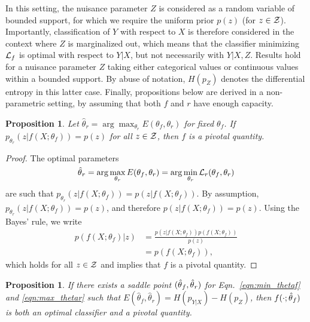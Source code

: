 \documentclass[twocolumn,superscriptaddress,aps]{revtex4-1}
\theoremstyle{plain}
\newtheorem{proposition}[theorem]{Proposition}
\begin{document}
In this setting, the nuisance parameter $Z$ is considered as a random variable
of bounded support, for which we require the uniform prior $p(z)$ (for $z \in
{\cal Z}$). Importantly, classification of $Y$ with respect to $X$ is therefore
considered in the context where $Z$ is marginalized out, which means that the
classifier minimizing ${\cal L}_f$ is optimal with respect to $Y|X$, but not
necessarily with $Y|X,Z$. Results hold for a nuisance parameter $Z$ taking
either categorical values or continuous values within a bounded support. By
abuse of notation, $H(p_Z)$ denotes the differential entropy in this latter
case. Finally, propositions below are derived in a non-parametric setting, by
assuming that both $f$ and $r$ have enough capacity.

\begin{proposition}\label{prop:1}
Let $\hat\theta_r = \arg \max_{\theta_r} E(\theta_f,
\theta_r)$ for fixed $\theta_f$. If $p_{\theta_r}(z|f(X;\theta_f)) = p(z)$
for all $z \in {\cal Z}$, then $f$ is a pivotal quantity.
\end{proposition}

\begin{proof}
The optimal parameters $$\smash{\hat\theta}_r =
\arg \max_{\theta_r} E(\theta_f, \theta_r) = \arg \min_{\theta_r} {\cal L}_r(\theta_f,
\theta_r)$$ are such that $p_{\theta_r}(z|f(X;\theta_f)) = p(z|f(X;\theta_f))$.
By assumption, $p_{\theta_r}(z|f(X;\theta_f)) = p(z)$,
and therefore $p(z|f(X;\theta_f)) = p(z)$.
Using the Bayes' rule, we write
\begin{align*}
    p(f(X;\theta_f)|z) &= \frac{ p(z|f(X;\theta_f)) p(f(X;\theta_f)) } { p(z)}\\
                       &= p(f(X;\theta_f)),
\end{align*}
which holds for all $z \in {\cal Z}$ and implies that $f$ is a pivotal quantity.
\end{proof}

\begin{proposition}\label{prop:2}
If there exists a saddle point $(\smash{\hat\theta}_f, \smash{\hat\theta}_r)$
for Eqn.~\ref{eqn:min_thetaf} and \ref{eqn:max_thetar} such that
$E(\hat\theta_f, \hat\theta_r) = H(p_{Y|X}) - H(p_Z)$, then
$f(\cdot;\smash{\hat\theta}_f)$ is both an optimal classifier and a pivotal
quantity.
\end{proposition}
\end{document}
